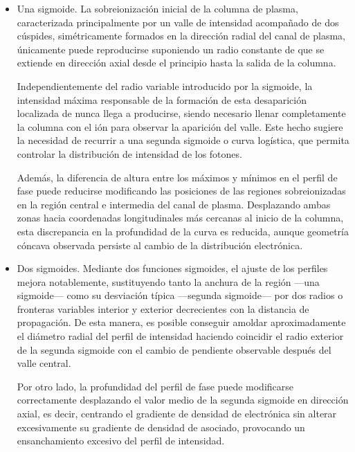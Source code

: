 \begin{itemize}

    \item Una sigmoide. La sobreionización inicial de la columna de plasma, caracterizada principalmente por un valle de intensidad acompañado de dos cúspides, simétricamente formados en la dirección radial del canal de plasma, únicamente puede reproducirse suponiendo un radio constante de  que se extiende en dirección axial desde el principio hasta la salida de la columna. 
      
      Independientemente del radio variable introducido por la sigmoide, la intensidad máxima responsable de la formación de esta desaparición localizada de  nunca llega a producirse, siendo necesario llenar completamente la columna con el ión para observar la aparición del valle. Este hecho sugiere la necesidad de recurrir a una segunda sigmoide o curva logística, que permita controlar la distribución de intensidad de los fotones.

      Además, la diferencia de altura entre los máximos y mínimos en el perfil de fase puede reducirse modificando las posiciones de las regiones sobreionizadas en la región central e intermedia del canal de plasma. Desplazando ambas zonas hacia coordenadas longitudinales más cercanas al inicio de la columna, esta discrepancia en la profundidad de la curva es reducida, aunque geometría cóncava observada persiste al cambio de la distribución electrónica. 
    \item Dos sigmoides. Mediante dos funciones sigmoides, el ajuste de los perfiles mejora notablemente, sustituyendo tanto la anchura de la región ---una sigmoide--- como su desviación típica ---segunda sigmoide--- por dos radios o fronteras variables interior y exterior decrecientes con la distancia de propagación. De esta manera, es posible conseguir amoldar aproximadamente el diámetro radial del perfil de intensidad haciendo coincidir el radio exterior de la segunda sigmoide con el cambio de pendiente observable después del valle central.

      Por otro lado, la profundidad del perfil de fase puede modificarse correctamente desplazando el valor medio de la segunda sigmoide en dirección axial, es decir, centrando el gradiente de densidad de electrónica sin alterar excesivamente su gradiente de densidad de  asociado, provocando un ensanchamiento excesivo del perfil de intensidad.


\end{itemize}

